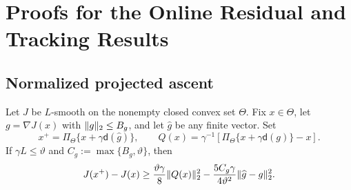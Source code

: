 \section{Proofs for the Online Residual and Tracking Results}\label{app:online}

\subsection{Normalized projected ascent}

\begin{lemma}\label{lem:projected-ascent}
Let $J$ be $L$-smooth on the nonempty closed convex set $\Theta$.  Fix $x\in\Theta$, let $g=\nabla J(x)$ with $\lVert g\rVert_2\le B_g$, and let $\widehat g$ be any finite vector.  Set
\[
 x^+=\Pi_\Theta\{x+\gamma\mathsf d(\widehat g)\},
 \qquad
 Q(x)=\gamma^{-1}[\Pi_\Theta\{x+\gamma\mathsf d(g)\}-x].
\]
If $\gamma L\le\vartheta$ and $C_g:=\max\{B_g,\vartheta\}$, then
\begin{equation}\label{eq:one-step-ascent}
 J(x^+)-J(x)
 \ge\frac{\vartheta\gamma}{8}\lVert Q(x)\rVert_2^2
 -\frac{5C_g\gamma}{4\vartheta^2}\lVert\widehat g-g\rVert_2^2.
\end{equation}
\end{lemma}

